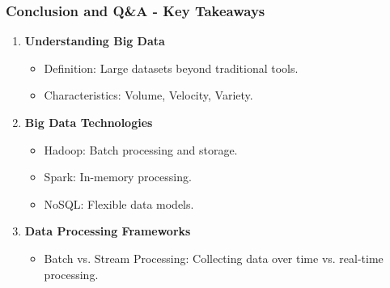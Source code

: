 \documentclass[aspectratio=169]{beamer}
\begin{document}
\begin{frame}[fragile]
    \frametitle{Conclusion and Q\&A - Key Takeaways}
    \begin{enumerate}
        \item \textbf{Understanding Big Data}
        \begin{itemize}
            \item Definition: Large datasets beyond traditional tools.
            \item Characteristics: Volume, Velocity, Variety.
        \end{itemize}
        
        \item \textbf{Big Data Technologies}
        \begin{itemize}
            \item Hadoop: Batch processing and storage.
            \item Spark: In-memory processing.
            \item NoSQL: Flexible data models.
        \end{itemize}
        
        \item \textbf{Data Processing Frameworks}
        \begin{itemize}
            \item Batch vs. Stream Processing: Collecting data over time vs. real-time processing.
        \end{itemize}
    \end{enumerate}
\end{frame}
\end{document}
